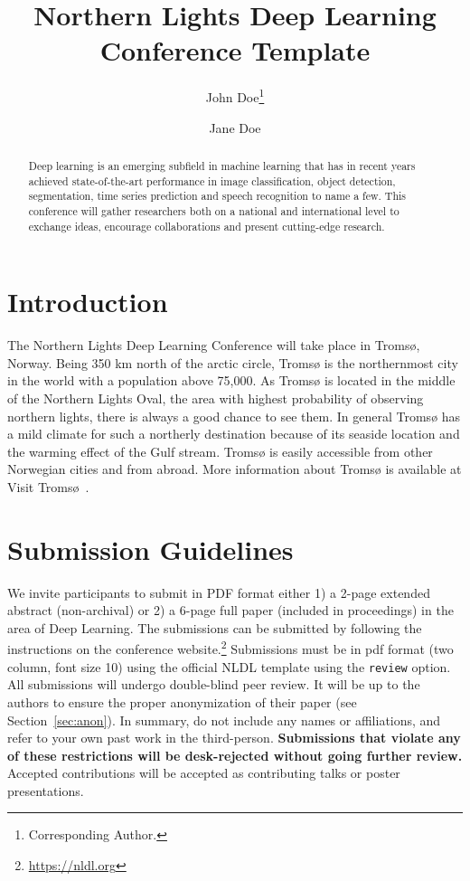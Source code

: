 \documentclass[fullpaper]{nldl}
\title{Northern Lights Deep Learning Conference Template}
\author[1]{John Doe\thanks{Corresponding Author.}}
\author[1,2]{Jane Doe}
\affil[1]{Affiliation 1}
\affil[2]{Affiliation 2}
\affil[ ]{\texttt{\{john.doe, jane.doe\}@affiliation.com}}
\begin{document}
\maketitle

\begin{abstract}
Deep learning is an emerging subfield in machine learning that has in recent years achieved state-of-the-art performance in image classification, object detection, segmentation, time series prediction and speech recognition to name a few.
This conference will gather researchers both on a national and international level to exchange ideas, encourage collaborations and present cutting-edge research.
\end{abstract}

\section{Introduction}
The Northern Lights Deep Learning Conference will take place in Troms{\o}, Norway.
Being 350 km north of the arctic circle, Troms{\o} is the northernmost city in the world with a population above 75,000.
As Troms{\o} is located in the middle of the Northern Lights Oval, the area with highest probability of observing northern lights, there is always a good chance to see them.
In general Troms{\o} has a mild climate for such a northerly destination because of its seaside location and the warming effect of the Gulf stream.
Troms{\o} is easily accessible from other Norwegian cities and from abroad.
More information about Troms{\o} is available at Visit Troms{\o}~\cite{tromso}.

\section{Submission Guidelines}
We invite participants to submit in PDF format either 1) a 2-page extended abstract (non-archival) or 2) a 6-page full paper (included in proceedings) in the area of Deep Learning.
The submissions can be submitted by following the instructions on the conference website.\footnote{\url{https://nldl.org}}
Submissions must be in pdf format (two column, font size 10) using the official NLDL template using the \verb|review| option.
All submissions will undergo double-blind peer review.
It will be up to the authors to ensure the proper anonymization of their paper (see Section~\ref{sec:anon}).
In summary, do not include any names or affiliations, and refer to your own past work in the third-person.
\textbf{Submissions that violate any of these restrictions will be desk-rejected without going further review.}
Accepted contributions will be accepted as contributing talks or poster presentations.
\end{document}
